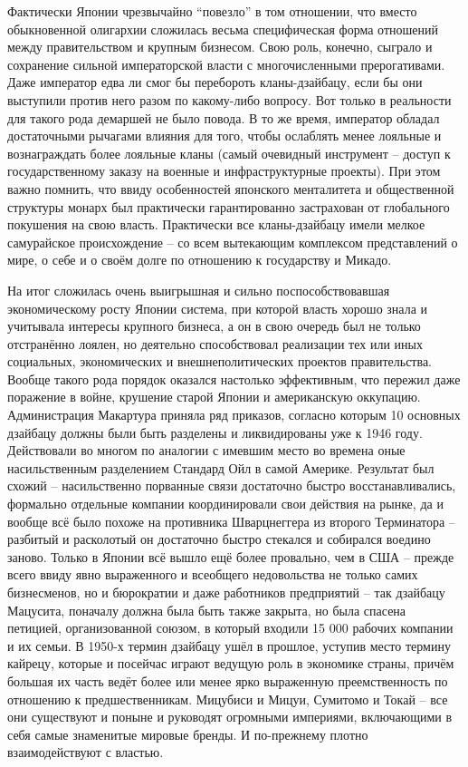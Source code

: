 Фактически Японии чрезвычайно “повезло” в том отношении, что вместо обыкновенной олигархии сложилась весьма специфическая форма отношений между правительством и крупным бизнесом. Свою роль, конечно, сыграло и сохранение сильной императорской власти с многочисленными прерогативами. Даже император едва ли смог бы перебороть кланы-дзайбацу, если бы они выступили против него разом по какому-либо вопросу. Вот только в реальности для такого рода демаршей не было повода. В то же время, император обладал достаточными рычагами влияния для того, чтобы ослаблять менее лояльные и вознаграждать более лояльные кланы (самый очевидный инструмент – доступ к государственному заказу на военные и инфраструктурные проекты). При этом важно помнить, что ввиду особенностей японского менталитета и общественной структуры монарх был практически гарантированно застрахован от глобального покушения на свою власть. Практически все кланы-дзайбацу имели мелкое самурайское происхождение – со всем вытекающим комплексом представлений о мире, о себе и о своём долге по отношению к государству и Микадо.

На итог сложилась очень выигрышная и сильно поспособствовавшая экономическому росту Японии система, при которой власть хорошо знала и учитывала интересы крупного бизнеса, а он в свою очередь был не только отстранённо лоялен, но деятельно способствовал реализации тех или иных социальных, экономических и внешнеполитических проектов правительства. Вообще такого рода порядок оказался настолько эффективным, что пережил даже поражение в войне, крушение старой Японии и американскую оккупацию. Администрация Макартура приняла ряд приказов, согласно которым 10 основных дзайбацу должны были быть разделены и ликвидированы уже к 1946 году. Действовали во многом по аналогии с имевшим место во времена оные насильственным разделением Стандард Ойл в самой Америке. Результат был схожий – насильственно порванные связи достаточно быстро восстанавливались, формально отдельные компании координировали свои действия на рынке, да и вообще всё было похоже на противника Шварцнеггера из второго Терминатора – разбитый и расколотый он достаточно быстро стекался и собирался воедино заново. Только в Японии всё вышло ещё более провально, чем в США – прежде всего ввиду явно выраженного и всеобщего недовольства не только самих бизнесменов, но и бюрократии и даже работников предприятий – так дзайбацу Мацусита, поначалу должна была быть также закрыта, но была спасена петицией, организованной союзом, в который входили 15 000 рабочих компании и их семьи. В 1950-х термин дзайбацу ушёл в прошлое, уступив место термину кайрецу, которые и посейчас играют ведущую роль в экономике страны, причём большая их часть ведёт более или менее ярко выраженную преемственность по отношению к предшественникам. Мицубиси и Мицуи, Сумитомо и Токай – все они существуют и поныне и руководят огромными империями, включающими в себя самые знаменитые мировые бренды. И по-прежнему плотно взаимодействуют с властью. 

